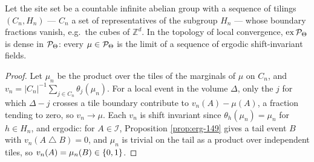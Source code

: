 \begin{theorem}[Georgii (14.12)]
    \label{thm:erg-1412}
    \leanok

    Let the site set be a countable infinite abelian group with a sequence of tilings
    $(C_n, H_n)$ --- $C_n$ a set of representatives of the subgroup $H_n$ --- whose boundary
    fractions vanish, e.g.\ the cubes of $\mathbb{Z}^d$. In the topology of local convergence,
    $\mathrm{ex}\,\mathcal{P}_\Theta$ is dense in $\mathcal{P}_\Theta$: every $\mu \in \mathcal{P}_\Theta$ is the
    limit of a sequence of ergodic shift-invariant fields.
\end{theorem}
\begin{proof}
    \leanok

    Let $\mu_n$ be the product over the tiles of the marginals of $\mu$ on $C_n$, and
    $v_n = |C_n|^{-1}\sum_{j \in C_n} \theta_j(\mu_n)$. For a local event in the volume $\Delta$,
    only the $j$ for which $\Delta - j$ crosses a tile boundary contribute to
    $v_n(A) - \mu(A)$, a fraction tending to zero, so $v_n \to \mu$. Each $v_n$ is shift
    invariant since $\theta_h(\mu_n) = \mu_n$ for $h \in H_n$, and ergodic: for $A \in \mathcal{I}$,
    Proposition \ref{prop:erg-149} gives a tail event $B$ with $v_n(A \mathbin{\triangle} B) = 0$,
    and $\mu_n$ is trivial on the tail as a product over independent tiles, so $v_n(A) = \mu_n(B)
    \in \left\{ 0,1 \right\}$.
\end{proof}

